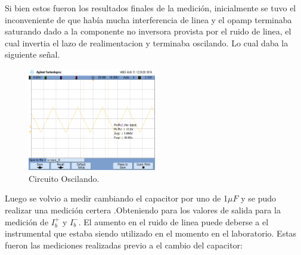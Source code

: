 Si bien estos fueron los resultados finales de la medición, inicialmente se tuvo el inconveniente de que había mucha interferencia de linea y el opamp terminaba saturando dado a la componente no inversora provista por el ruido de linea, el cual invertia el lazo de realimentacion y terminaba oscilando.
Lo cual daba la siguiente señal.
\begin{figure}[H]	
	\centering
	\includegraphics[width=0.5\textwidth]{imagenes/opmpOscilando.png}
	\caption{Circuito Oscilando.}
	\label{fig:oscilando}
\end{figure}
Luego se volvio a medir cambiando el capacitor por uno de 1$\mu F$ 
y  se pudo realizar una medición certera .Obteniendo para los valores de salida para la medición de $I_b^+$ y $I_b^-$. El aumento en el ruido de linea puede deberse a el instrumental que estaba siendo utilizado en el momento en el laboratorio.
Estas fueron las mediciones realizadas previo a el cambio del capacitor:
